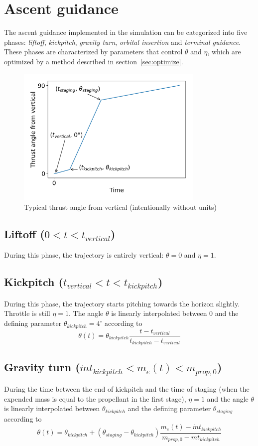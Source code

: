 \documentclass[11pt]{article}
\begin{document}
\section{Ascent guidance}
The ascent guidance implemented in the simulation can be categorized into five phases: 
\textit{liftoff}, 
\textit{kickpitch}, 
\textit{gravity turn}, 
\textit{orbital insertion} and 
\textit{terminal guidance}.
These phases are characterized by parameters that control $\theta$ and $\eta$, which are optimized by a method described in section~\ref{sec:optimize}. 

\begin{figure}[H]
  \centering
  \includegraphics[width=0.8\textwidth]{./plots/angleFromVertical.png}
  \caption{Typical thrust angle from vertical (intentionally without units)}
\end{figure}

\subsection{Liftoff ($0 < t < t_{vertical}$)}
During this phase, the trajectory is entirely vertical: $\theta = 0$ and $\eta = 1$.

\subsection{Kickpitch ($t_{vertical} < t < t_{kickpitch}$)}
During this phase, the trajectory starts pitching towards the horizon slightly. Throttle is still $\eta = 1$.
The angle $\theta$ is linearly interpolated between 0 and the defining parameter $\theta_{kickpitch} = 4^{\circ}$ according to
$$
\theta(t) = \theta_{kickpitch} \frac{t - t_{vertical}}{t_{kickpitch} - t_{vertical}}
$$

\subsection{Gravity turn ($\dot{m} t_{kickpitch} < m_e(t) < m_{prop,0}$)}
During the time between the end of kickpitch and the time of staging (when the expended mass is equal to the propellant in the first stage),
$\eta = 1$ and the angle $\theta$ is linearly interpolated between $\theta_{kickpitch}$ and the defining parameter $\theta_{staging}$ according to
$$
\theta(t) = \theta_{kickpitch} + \left( \theta_{staging} - \theta_{kickpitch} \right) \frac{m_e(t) - \dot{m} t_{kickpitch}}{m_{prop,0} - \dot{m} t_{kickpitch}}
$$
\end{document}
